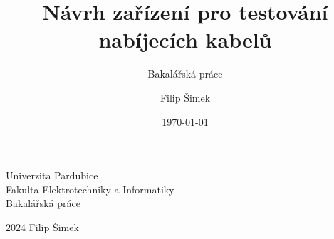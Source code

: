 \documentclass[22pt,a4paper,titlepage]{scrreprt}
\title{Návrh zařízení pro testování nabíjecích kabelů}
\subtitle{Bakalářská práce}
\author{Filip Šimek}
\date{\today}
\begin{document}
	\begin{titlepage}
		\begin{center}
			{Univerzita Pardubice} \\
			{Fakulta Elektrotechniky a Informatiky} \\
			\vfill
			{Bakalářská práce}
			\vfill
			\end{center}
			{2024} \hfill {Filip Šimek}
	\end{titlepage}
\end{document}
